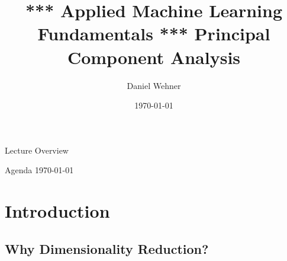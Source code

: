 


\title[Principal Component Analysis]{*** Applied Machine Learning Fundamentals *** Principal Component Analysis}
\author{Daniel Wehner}
\date{\today}




\maketitlepage


\begin{frame}{Lecture Overview}{}
\end{frame}


\begin{frame}{Agenda \today}
	\begin{multicols}{2}
		\tableofcontents
	\end{multicols}
\end{frame}


\section{Introduction}

\subsection{Why Dimensionality Reduction?}

